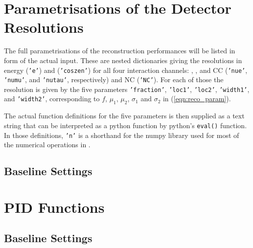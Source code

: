 \chapter{Parametrisations of the Detector Resolutions}
\label{app:reco_params}

The full parametrisations of the reconstruction performances will be listed in
form of the actual \papa input. These are nested dictionaries giving the
resolutions in energy (\texttt{'e'}) and \coszen (\texttt{'coszen'}) for all
four interaction channels: \nue, \numu, and \nutau CC (\texttt{'nue'},
\texttt{'numu'}, and \texttt{'nutau'}, respectively) and \nux NC
(\texttt{'NC'}). For each of those the resolution is given by the five
parameters \texttt{'fraction'}, \texttt{'loc1'}, \texttt{'loc2'},
\texttt{'width1'}, and \texttt{'width2'}, corresponding to $f$, $\mu_1$,
$\mu_2$, $\sigma_1$ and $\sigma_2$ in (\ref{eqn:reco_param}).

The actual function definitions for the five parameters is then supplied as a
text string that can be interpreted as a python function by python's
\texttt{eval()} function. In those definitions, \texttt{'n'} is a shorthand
for the numpy library \cite{numpy} used for most of the numerical operations in
\papa.

\section{Baseline Settings}


% 


\chapter{PID Functions}
\label{app:pid}

\section{Baseline Settings}

